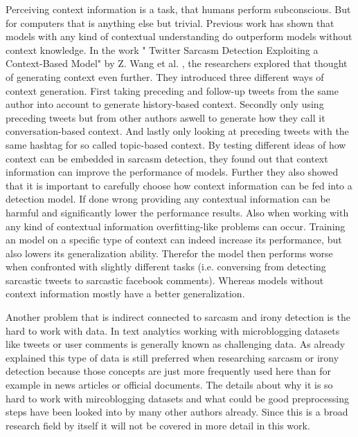 \documentclass[sigconf,  review=false, nonacm=true]{acmart}
\begin{document}
Perceiving context information is a task, that humans perform subconscious. But for computers that is anything else but trivial. Previous work \cite{The-Role-of-Conversation-Context-for-Sarcasm-Detection-in-Online-Interactions} has shown that models with any kind of contextual understanding do outperform models without context knowledge. In the work " Twitter Sarcasm Detection Exploiting a Context-Based Model" by Z. Wang et al. \cite{Twitter-Sarcasm-Detection-Exploiting-a-Context-Based-Model}, the researchers explored that thought of generating context even further. They introduced three different ways of context generation. First taking preceding and follow-up tweets from the same author into account to generate history-based context. Secondly only using preceding tweets but from other authors aswell to generate how they call it conversation-based context. And lastly only looking at preceding tweets with the same hashtag for so called topic-based context.
By testing different ideas of how context can be embedded in sarcasm detection, they found out that context information can improve the performance of models. Further they also showed that it is important to carefully choose how context information can be fed into a detection model. If done wrong providing any contextual information can be harmful and significantly lower the performance results.
Also when working with any kind of contextual information overfitting-like problems can occur. Training an model on a specific type of context can indeed increase its performance, but also lowers its generalization ability. Therefor the model then performs worse when confronted with slightly different tasks (i.e. conversing from detecting sarcastic tweets to sarcastic facebook comments). Whereas models without context information mostly have a better generalization.

Another problem that is indirect connected to sarcasm and irony detection is the hard to work with data. In text analytics working with microblogging datasets like tweets or user comments is generally known as challenging data. As already explained this type of data is still preferred when researching sarcasm or irony detection because those concepts are just more frequently used here than for example in news articles or official documents. The details about why it is so hard to work with mircoblogging datasets and what could be good preprocessing steps have been looked into by many other authors \cite{The-effect-of-preprocessing-techniques-on-Twitter-sentiment-analysis} \cite{Analysis-of-Twitter-Specific-Preprocessing-Technique-for-Tweets} \cite{Effective-Text-Data-Preprocessing-Technique-for-Sentiment-Analysis-in-Social-Media-Data} \cite{Efficient-Algorithms-for-Preprocessing-and-Stemming-of-Tweets-in-a-Sentiment-Analysis-System} already. Since this is a broad research field by itself it will not be covered in more detail in this work.
\end{document}
